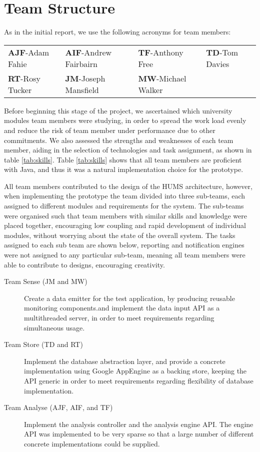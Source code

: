 \section{Team Structure}
\label{sec:team}

As in the initial report, we use the following acronyms for team members:

\begin{tabular}{ p{3cm} p{4cm} p{3.5cm} p{3.5cm} }
  \textbf{AJF}-Adam Fahie &
  \textbf{AIF}-Andrew Fairbairn &
  \textbf{TF}-Anthony Free &
  \textbf{TD}-Tom Davies \\
    \textbf{RT}-Rosy Tucker &
  \textbf{JM}-Joseph Mansfield &
  \textbf{MW}-Michael Walker \\
\end{tabular}

Before beginning this stage of the project, we ascertained which university modules team members were studying, in order to spread the work load evenly and reduce the risk of team member under performance due to other commitments. We also assessed the strengths and weaknesses of each team member, aiding in the selection of technologies and task assignment, as shown in table \ref{tab:skills}. Table \ref{tab:skills} shows that all team members are proficient with Java, and thus it was a natural implementation choice for the prototype.

All team members contributed to the design of the HUMS architecture, however, when implementing the prototype the team divided into three sub-teams, each assigned to different modules and requirements for the system.
The sub-teams were organised such that team members with similar skills and knowledge were placed together, encouraging low coupling and rapid development of individual modules, without worrying about the state of the overall system. The tasks assigned to each sub team are shown below, reporting and notification engines were not assigned to any particular sub-team, meaning all team members were able to contribute to designs, encouraging creativity.

\begin{description}
  \item[Team Sense  (JM and MW)] Create a data emitter for the test application, by producing reusable monitoring components.and implement the data input API as a multithreaded server, in order to meet requirements  regarding simultaneous usage.
    
  \item[Team Store  (TD and RT)] Implement the database abstraction layer, and provide a concrete implementation using Google AppEngine as a backing store, keeping the API generic in order to meet requirements regarding flexibility of database implementation.

  \item[Team Analyse (AJF, AIF, and TF)] Implement the analysis controller and the analysis engine API. The engine API was implemented to be very sparse so that a large number of different concrete implementations could be supplied. 
\end{description}

